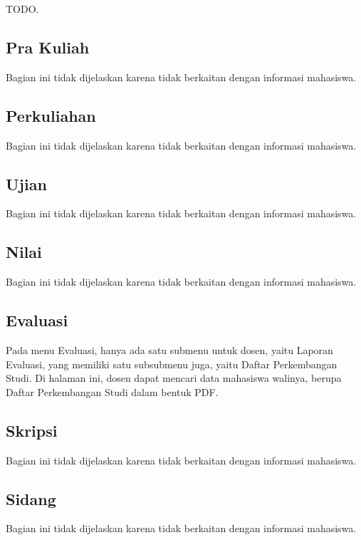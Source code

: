 TODO.

\subsection{Pra Kuliah}

Bagian ini tidak dijelaskan karena tidak berkaitan dengan informasi mahasiswa.

\subsection{Perkuliahan}

Bagian ini tidak dijelaskan karena tidak berkaitan dengan informasi mahasiswa.

\subsection{Ujian}

Bagian ini tidak dijelaskan karena tidak berkaitan dengan informasi mahasiswa.

\subsection{Nilai}

Bagian ini tidak dijelaskan karena tidak berkaitan dengan informasi mahasiswa.

\subsection{Evaluasi}

Pada menu Evaluasi, hanya ada satu submenu untuk dosen, yaitu Laporan Evaluasi, yang memiliki satu subsubmenu juga, yaitu Daftar Perkembangan Studi. Di halaman ini, dosen dapat mencari data mahasiswa walinya, berupa Daftar Perkembangan Studi dalam bentuk PDF.

\subsection{Skripsi}

Bagian ini tidak dijelaskan karena tidak berkaitan dengan informasi mahasiswa.

\subsection{Sidang}

Bagian ini tidak dijelaskan karena tidak berkaitan dengan informasi mahasiswa.

